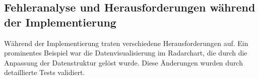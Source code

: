 \subsection{Fehleranalyse und Herausforderungen während der Implementierung}
Während der Implementierung traten verschiedene Herausforderungen auf. Ein prominentes Beispiel war die Datenvisualisierung im Radarchart, die durch die Anpassung der Datenstruktur gelöst wurde. Diese Änderungen wurden durch detaillierte Tests validiert.
